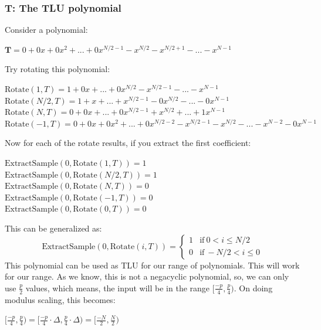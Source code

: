\documentclass{report}
\begin{document}
\subsubsection*{T: The TLU polynomial}
Consider a polynomial:
\begin{center}
	$\mathbf{T} = 0 + 0x + 0x^2 + ... + 0x^{N/2 - 1} - x^{N/2} - x^{N/2 + 1} - ... - x^{N-1}$
\end{center}
Try rotating this polynomial:\\
\begin{center}
	$\text{Rotate}(1, T) = 1 + 0x + ... + 0x^{N/2} - x^{N/2 - 1} - ... - x^{N-1}$\\
	$\text{Rotate}(N/2, T) = 1 + x + ... + x^{N/2 -1 } - 0x^{N/2} - ... - 0x^{N-1}$\\
	$\text{Rotate}(N, T) = 0 + 0x + ... + 0x^{N/2 -1 } + x^{N/2} + ... + 1x^{N-1}$\\
	$\text{Rotate}(-1, T) = 0 + 0x + 0x^2 + ... + 0x^{N/2 - 2} - x^{N/2 - 1} - x^{N/2} - ... - x^{N-2} - 0x^{N-1}$
\end{center}
Now for each of the rotate results, if you extract the first coefficient:
\begin{center}
	$\text{ExtractSample}(0, \text{Rotate}(1, T)) = 1$\\
	$\text{ExtractSample}(0, \text{Rotate}(N/2, T)) = 1$\\
	$\text{ExtractSample}(0, \text{Rotate}(N, T)) = 0$\\
	$\text{ExtractSample}(0, \text{Rotate}(-1, T)) = 0$\\
	$\text{ExtractSample}(0, \text{Rotate}(0, T)) = 0$
\end{center}
This can be generalized as:
\begin{equation}
	\text{ExtractSample}(0, \text{Rotate}(i, T)) = 
	\begin{cases}
		1 & \text{if} \ 0 < i \leq N/2\\
		0 & \text{if} \ -N/2 < i \leq 0
	\end{cases}
\end{equation}
This polynomial can be used as TLU for our range of polynomials. This will work for our range. As we know, this is not a negacyclic polynomial, so, we can only use $\frac{p}{2}$ values, which means, the input will be in the range $[\frac{-p}{4}, \frac{p}{4})$. On doing modulus scaling, this becomes:
\begin{center}
	$[\frac{-p}{4}, \frac{p}{4}) = [\frac{-p}{4} \cdot \Delta, \frac{p}{4} \cdot \Delta) = [\frac{-N}{2}, \frac{N}{2})$
\end{center}
\end{document}
